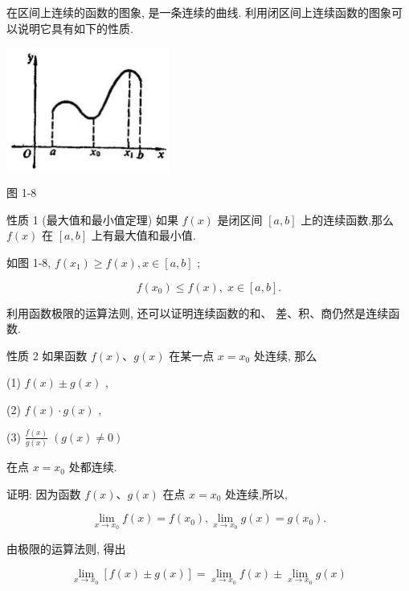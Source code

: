 \documentclass[10pt]{article}
\begin{document}
在区间上连续的函数的图象, 是一条连续的曲线. 利用闭区间上连续函数的图象可以说明它具有如下的性质.

\begin{center}
\includegraphics[max width=0.4\textwidth]{images/01912c18-5c3f-733d-b775-749ba9897a9d_34_898703.jpg}
\end{center}

图 1-8

性质 1 (最大值和最小值定理) 如果 \(f\left( x\right)\) 是闭区间 \(\left\lbrack {a,b}\right\rbrack\) 上的连续函数,那么 \(f\left( x\right)\) 在 \(\left\lbrack {a,b}\right\rbrack\) 上有最大值和最小值.

如图 1-8, \(f\left( {x}_{1}\right) \geq f\left( x\right) ,x \in \left\lbrack {a,b}\right\rbrack\) ;

\[
f\left( {x}_{0}\right) \leq f\left( x\right) ,\;x \in \left\lbrack {a,b}\right\rbrack .
\]

利用函数极限的运算法则, 还可以证明连续函数的和、 差、积、商仍然是连续函数.

性质 2 如果函数 \(f\left( x\right) \text{、}g\left( x\right)\) 在某一点 \(x = {x}_{0}\) 处连续, 那么

(1) \(f\left( x\right) \pm g\left( x\right)\) ,

(2) \(f\left( x\right) \cdot g\left( x\right)\) ,

(3) \(\frac{f\left( x\right) }{g\left( x\right) }\;\left( {g\left( x\right) \neq 0}\right)\)

在点 \(x = {x}_{0}\) 处都连续.

证明: 因为函数 \(f\left( x\right) \text{、}g\left( x\right)\) 在点 \(x = {x}_{0}\) 处连续,所以,

\[
\mathop{\lim }\limits_{{x \rightarrow {x}_{0}}}f\left( x\right) = f\left( {x}_{0}\right) ,\mathop{\lim }\limits_{{x \rightarrow {x}_{0}}}g\left( x\right) = g\left( {x}_{0}\right) .
\]

由极限的运算法则, 得出

\[
\mathop{\lim }\limits_{{x \rightarrow {x}_{0}}}\left\lbrack {f\left( x\right) \pm g\left( x\right) }\right\rbrack = \mathop{\lim }\limits_{{x \rightarrow {x}_{0}}}f\left( x\right) \pm \mathop{\lim }\limits_{{x \rightarrow {x}_{0}}}g\left( x\right)
\]
\end{document}
